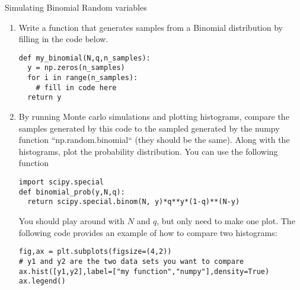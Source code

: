 \begin{exercise}{Simulating Binomial Random variables}
\begin{enumerate}[label=(\alph*)]
\item  Write a function that generates samples from a Binomial distribution by filling in the code below. 
\begin{Verbatim}
def my_binomial(N,q,n_samples):
  y = np.zeros(n_samples)
  for i in range(n_samples):
    # fill in code here
  return y
\end{Verbatim}
\item By running Monte carlo simulations and plotting histograms, compare the samples generated by this code to the sampled generated by the numpy function ``np.random.binomial`` (they should be the same). Along with the histograms, plot the probability distribution. You can use the following function 
\begin{Verbatim}
import scipy.special
def binomial_prob(y,N,q):
  return scipy.special.binom(N, y)*q**y*(1-q)**(N-y)
\end{Verbatim}
You should play around with $N$ and $q$, but only need to make one plot. 
The following code provides an example of how to compare two histograms:

\begin{Verbatim}
fig,ax = plt.subplots(figsize=(4,2))
# y1 and y2 are the two data sets you want to compare
ax.hist([y1,y2],label=["my function","numpy"],density=True)
ax.legend()
\end{Verbatim}
\end{enumerate}



 



\end{exercise}